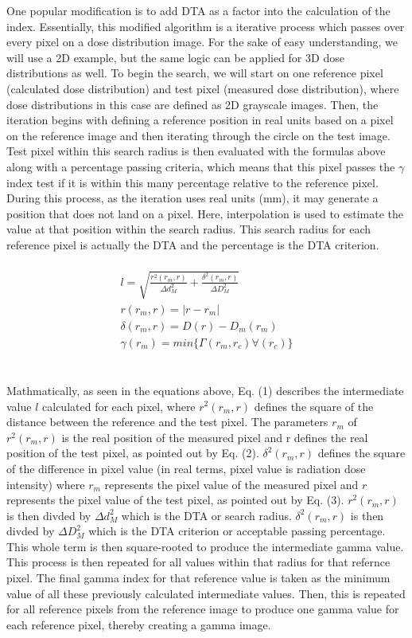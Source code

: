 \documentclass[12pt]{article}
\begin{document}
One popular modification is to add DTA as a factor into the calculation of the index. Essentially, this modified algorithm is a iterative process which passes over every pixel on a dose distribution image. For the sake of easy understanding, we will use a 2D example, but the same logic can be applied for 3D dose distributions as well. To begin the search, we will start on one reference pixel (calculated dose distribution) and test pixel (measured dose distribution), where dose distributions in this case are defined as 2D grayscale images. Then, the iteration begins with defining a reference position in real units based on a pixel on the reference image and then iterating through the circle on the test image. Test pixel within this search radius is then evaluated with the formulas above along with a percentage passing criteria, which means that this pixel passes the $\gamma$ index test if it is within this many percentage relative to the reference pixel. During this process, as the iteration uses real units (mm), it may generate a position that does not land on a pixel. Here, interpolation is used to estimate the value at that position within the search radius. This search radius for each reference pixel is actually the DTA and the percentage is the DTA criterion.
\\
\\
\begin{align}
  l = \sqrt{\frac{r^{2}(r_{m}, r)}{\Delta d^{2}_{M}} + \frac{\delta^{2}(r_{m}, r)}{\Delta D^{2}_{M}}} \\
  r(r_{m}, r) = \lvert r-r_{m} \lvert \\
  \delta(r_{m}, r) = D(r)-D_{m}(r_{m}) \\
  \gamma(r_{m}) = min\{\Gamma(r_{m}, r_{c})\forall(r_{c})\}
\end{align}
\\
\\
Mathmatically, as seen in the equations above, Eq. (1) describes the intermediate value $l$ calculated for each pixel, where $r^{2}(r_{m}, r)$ defines the square of the distance between the reference and the test pixel. The parameters $r_{m}$ of $r^{2}(r_{m}, r)$ is the real position of the measured pixel and r defines the real position of the test pixel, as pointed out by Eq. (2). $\delta^{2}(r_{m}, r)$ defines the square of the difference in pixel value (in real terms, pixel value is radiation dose intensity) where $r_{m}$ represents the pixel value of the measured pixel and $r$ represents the pixel value of the test pixel, as pointed out by Eq. (3). $r^{2}(r_{m}, r)$ is then divded by $\Delta d^{2}_{M}$ which is the DTA or search radius. $\delta^{2}(r_{m}, r)$ is then divded by $\Delta D^{2}_{M}$ which is the DTA criterion or acceptable passing percentage. This whole term is then square-rooted to produce the intermediate gamma value. This process is then repeated for all values within that radius for that refernce pixel. The final gamma index for that reference value is taken as the minimum value of all these previously calculated intermediate values. Then, this is repeated for all reference pixels from the reference image to produce one gamma value for each reference pixel, thereby creating a gamma image.
\end{document}
